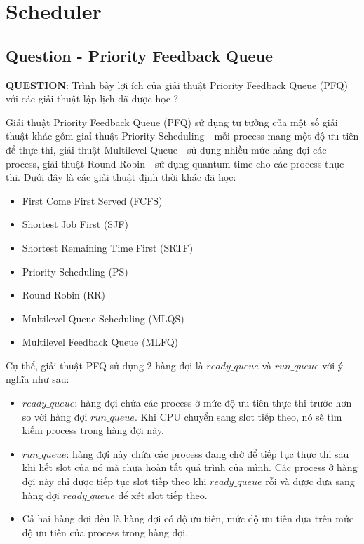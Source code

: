 \section{Scheduler}

\subsection{Question - Priority Feedback Queue}

\textbf{QUESTION}: Trình bày lợi ích của giải thuật Priority Feedback Queue (PFQ) với các giải thuật lập lịch đã được học ?

\vspace{0.5cm}

Giải thuật Priority Feedback Queue (PFQ) sử dụng tư tưởng của một số giải thuật khác gồm giaỉ thuật Priority Scheduling - mỗi process mang một độ ưu tiên để thực thi, giải thuật Multilevel Queue - sử dụng nhiều mức hàng đợi các process, giải thuật Round Robin - sử dụng quantum time cho các process thực thi. Dưới đây là các giải thuật định thời khác đã học:

\begin{itemize}
	\item First Come First Served (FCFS)
	\item Shortest Job First (SJF)
	\item Shortest Remaining Time First (SRTF)
	\item Priority Scheduling (PS)
	\item Round Robin (RR)
	\item Multilevel Queue Scheduling (MLQS)
	\item Multilevel Feedback Queue (MLFQ)
\end{itemize}

Cụ thể, giải thuật PFQ sử dụng 2 hàng đợi là $ ready\_queue $ và $ run\_queue $ với ý nghĩa như sau:

\vspace{0.5cm}

\begin{itemize}
	\item $ ready\_queue $: hàng đợi chứa các process ở mức độ ưu tiên thực thi trước hơn so với hàng đợi $ run\_queue $. Khi CPU chuyển sang slot tiếp theo, nó sẽ tìm kiếm process trong hàng đợi này. 
	\item $ run\_queue $: hàng đợi này chứa các process đang chờ để tiếp tục thực thi sau khi hết slot của nó mà chưa hoàn tất quá trình của mình. Các process ở hàng đợi này chỉ được tiếp tục slot tiếp theo khi $ ready\_queue $ rỗi và được đưa sang hàng đợi  $ ready\_queue $ để xét slot tiếp theo.
	\item Cả hai hàng đợi đều là hàng đợi có độ ưu tiên, mức độ ưu tiên dựa trên mức độ ưu tiên của process trong hàng đợi.
\end{itemize}

